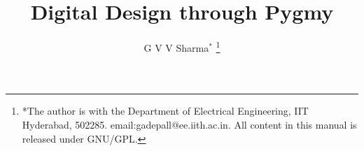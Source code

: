 \documentclass[journal,12pt,twocolumn]{IEEEtran}
\renewcommand\thesection{\arabic{section}}
\begin{document}
\let\StandardTheFigure\thefigure
\let\vec\mathbf
\renewcommand{\thefigure}{\thesection}



\def\putbox#1#2#3{\makebox[0in][l]{\makebox[#1][l]{}\raisebox{\baselineskip}[0in][0in]{\raisebox{#2}[0in][0in]{#3}}}}
     \def\rightbox#1{\makebox[0in][r]{#1}}
     \def\centbox#1{\makebox[0in]{#1}}
     \def\topbox#1{\raisebox{-\baselineskip}[0in][0in]{#1}}
     \def\midbox#1{\raisebox{-0.5\baselineskip}[0in][0in]{#1}}

\vspace{3cm}

\title{
Digital Design through Pygmy
}
\author{ 
G V V Sharma$^{*}$%
	\thanks{*The author is with the Department of Electrical Engineering, IIT Hyderabad, 502285. email:gadepall@ee.iith.ac.in. All content in this manual is released under GNU/GPL.}
	
}	

	


%
%
%
\end{document}
